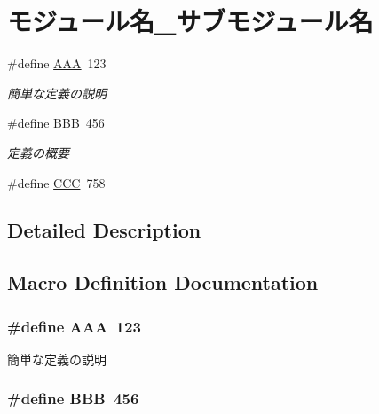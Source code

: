 \hypertarget{group__モジュール名__サブモジュール名}{\section{モジュール名\+\_\+サブモジュール名}
\label{group__モジュール名__サブモジュール名}
}
\begin{DoxyCompactItemize}
\item 
\#define \hyperlink{group__モジュール名__サブモジュール名_gaaa395e97f585ddcb72524058797caf37}{A\+A\+A}~123
\begin{DoxyCompactList}\small\item\em 簡単な定義の説明 \end{DoxyCompactList}\item 
\#define \hyperlink{group__モジュール名__サブモジュール名_ga56f71db70e5d3eb35f197bd1499987b1}{B\+B\+B}~456
\begin{DoxyCompactList}\small\item\em 定義の概要 \end{DoxyCompactList}\item 
\#define \hyperlink{group__モジュール名__サブモジュール名_gaac3f153b43e30e4004c50123561bb145}{C\+C\+C}~758
\end{DoxyCompactItemize}


\subsection{Detailed Description}


\subsection{Macro Definition Documentation}
\hypertarget{group__モジュール名__サブモジュール名_gaaa395e97f585ddcb72524058797caf37}{
\subsubsection[{A\+A\+A}]{\setlength{\rightskip}{0pt plus 5cm}\#define A\+A\+A~123}}\label{group__モジュール名__サブモジュール名_gaaa395e97f585ddcb72524058797caf37}


簡単な定義の説明 

\hypertarget{group__モジュール名__サブモジュール名_ga56f71db70e5d3eb35f197bd1499987b1}{
\subsubsection[{B\+B\+B}]{\setlength{\rightskip}{0pt plus 5cm}\#define B\+B\+B~456}}\label{group__モジュール名__サブモジュール名_ga56f71db70e5d3eb35f197bd1499987b1}



